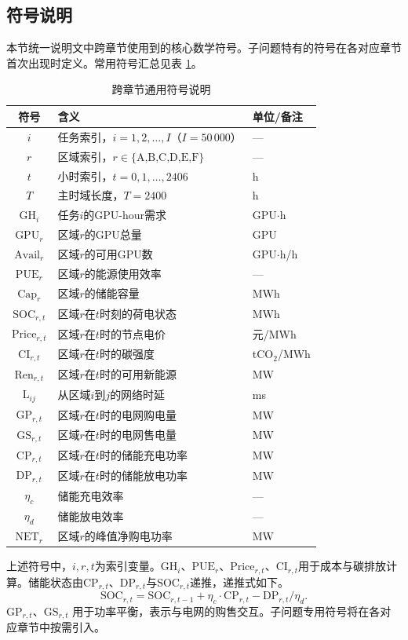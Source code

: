 \subsection{符号说明}

本节统一说明文中跨章节使用到的核心数学符号。子问题特有的符号在各对应章节首次出现时定义。常用符号汇总见表 \ref{tab:symbols}。

\begin{table}[h]
\centering
\caption{跨章节通用符号说明}
\label{tab:symbols}
\small
\begin{tabular}{c p{} p{}}
\toprule
符号 & 含义 & 单位/备注 \\
\midrule
$i$ & 任务索引，$i=1,2,\dots,I$（$I=50\,000$） & — \\
$r$ & 区域索引，$r\in\{\text{A,B,C,D,E,F}\}$ & — \\
$t$ & 小时索引，$t=0,1,\dots,2406$ & h \\
$T$ & 主时域长度，$T=2400$ & h \\
$\text{GH}_i$ & 任务$i$的GPU-hour需求 & GPU$\cdot$h \\
$\text{GPU}_r$ & 区域$r$的GPU总量 & GPU \\
$\text{Avail}_r$ & 区域$r$的可用GPU数 & GPU$\cdot$h/h \\
$\text{PUE}_r$ & 区域$r$的能源使用效率 & — \\
$\text{Cap}_r$ & 区域$r$的储能容量 & MWh \\
$\text{SOC}_{r,t}$ & 区域$r$在$t$时刻的荷电状态 & MWh \\
$\text{Price}_{r,t}$ & 区域$r$在$t$时的节点电价 & 元/MWh \\
$\text{CI}_{r,t}$ & 区域$r$在$t$时的碳强度 & tCO$_2$/MWh \\
$\text{Ren}_{r,t}$ & 区域$r$在$t$时的可用新能源 & MW \\
$\text{L}_{ij}$ & 从区域$i$到$j$的网络时延 & ms \\
$\text{GP}_{r,t}$ & 区域$r$在$t$时的电网购电量 & MW \\
$\text{GS}_{r,t}$ & 区域$r$在$t$时的电网售电量 & MW \\
$\text{CP}_{r,t}$ & 区域$r$在$t$时的储能充电功率 & MW \\
$\text{DP}_{r,t}$ & 区域$r$在$t$时的储能放电功率 & MW \\
$\eta_c$ & 储能充电效率 & — \\
$\eta_d$ & 储能放电效率 & — \\
$\text{NET}_{r}$ & 区域$r$的峰值净购电功率 & MW \\
\bottomrule
\end{tabular}
\end{table}

上述符号中，$i,r,t$为索引变量。$\text{GH}_i$、$\text{PUE}_r$、$\text{Price}_{r,t}$、$\text{CI}_{r,t}$用于成本与碳排放计算。储能状态由$\text{CP}_{r,t}$、$\text{DP}_{r,t}$与$\text{SOC}_{r,t}$递推，递推式如下。
\[
\text{SOC}_{r,t} = \text{SOC}_{r,t-1} + \eta_c \cdot \text{CP}_{r,t} - \text{DP}_{r,t}/\eta_d .
\]
$\text{GP}_{r,t}$、$\text{GS}_{r,t}$ 用于功率平衡，表示与电网的购售交互。子问题专用符号将在各对应章节中按需引入。
